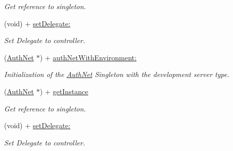 \begin{DoxyCompactItemize}
\begin{DoxyCompactList}\small\item\em Get reference to singleton. \item\end{DoxyCompactList}\item 
(void) + \hyperlink{interface_auth_net_aea5da974fc41578357c9919df5d34fee}{setDelegate:}
\begin{DoxyCompactList}\small\item\em Set Delegate to controller. \item\end{DoxyCompactList}\item 
(\hyperlink{interface_auth_net}{AuthNet} $\ast$) + \hyperlink{interface_auth_net_a786b06faf840607cc5dd722ab101394a}{authNetWithEnvironment:}
\begin{DoxyCompactList}\small\item\em Initialization of the \hyperlink{interface_auth_net}{AuthNet} Singleton with the development server type. \item\end{DoxyCompactList}\item 
\hypertarget{interface_auth_net_a0f038013f30dbc3cd4980c3bf038310d}{
(\hyperlink{interface_auth_net}{AuthNet} $\ast$) + \hyperlink{interface_auth_net_a0f038013f30dbc3cd4980c3bf038310d}{getInstance}}
\label{interface_auth_net_a0f038013f30dbc3cd4980c3bf038310d}

\begin{DoxyCompactList}\small\item\em Get reference to singleton. \item\end{DoxyCompactList}\item 
(void) + \hyperlink{interface_auth_net_aea5da974fc41578357c9919df5d34fee}{setDelegate:}
\begin{DoxyCompactList}\small\item\em Set Delegate to controller. \item\end{DoxyCompactList}\end{DoxyCompactItemize}
